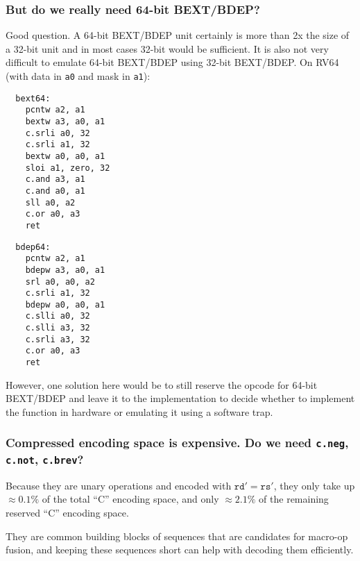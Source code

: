 \subsubsection{But do we really need 64-bit BEXT/BDEP?}

Good question. A 64-bit BEXT/BDEP unit certainly is more than 2x the size of a
32-bit unit and in most cases 32-bit would be sufficient. It is also not very difficult
to emulate 64-bit BEXT/BDEP using 32-bit BEXT/BDEP. On RV64 (with data in {\tt a0} and
mask in {\tt a1}):

\begin{multicols}{2}
\begin{minipage}{\linewidth}
\begin{verbatim}
  bext64:
    pcntw a2, a1
    bextw a3, a0, a1
    c.srli a0, 32
    c.srli a1, 32
    bextw a0, a0, a1
    sloi a1, zero, 32
    c.and a3, a1
    c.and a0, a1
    sll a0, a2
    c.or a0, a3
    ret
\end{verbatim}
\end{minipage}

\begin{minipage}{\linewidth}
\begin{verbatim}
  bdep64:
    pcntw a2, a1
    bdepw a3, a0, a1
    srl a0, a0, a2
    c.srli a1, 32
    bdepw a0, a0, a1
    c.slli a0, 32
    c.slli a3, 32
    c.srli a3, 32
    c.or a0, a3
    ret
\end{verbatim}
\end{minipage}
\end{multicols}

However, one solution here would be to still reserve the opcode for 64-bit
BEXT/BDEP and leave it to the implementation to decide whether to implement the
function in hardware or emulating it using a software trap.

\subsubsection{Compressed encoding space is expensive. Do we need {\tt c.neg}, {\tt c.not}, {\tt c.brev}?}

Because they are unary operations and encoded with $\texttt{rd}' = \texttt{rs}'$, they only take
up $\approx 0.1\%$ of the total ``C'' encoding space, and only $\approx 2.1\%$
of the remaining reserved ``C'' encoding space.

They are common building blocks of sequences that are candidates for macro-op fusion,
and keeping these sequences short can help with decoding them efficiently.

